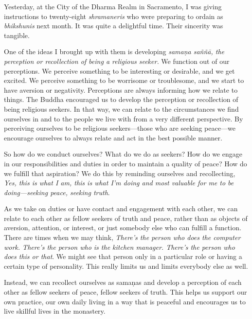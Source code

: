 
Yesterday, at the City of the Dharma Realm in Sacramento, I was giving 
instructions to twenty-eight \emph{shramaneris} who were preparing to 
ordain as \emph{bhikshunis} next month. It was quite a delightful time. 
Their sincerity was tangible.

One of the ideas I brought up with them is developing \emph{samaṇa 
saññā, the perception or recollection of being a religious seeker.} 
We function out of our perceptions. We perceive something to be 
interesting or desirable, and we get excited. We perceive something to 
be worrisome or troublesome, and we start to have aversion or 
negativity. Perceptions are always informing how we relate to things. 
The Buddha encouraged us to develop the perception or recollection of 
being religious seekers. In that way, we can relate to the 
circumstances we find ourselves in and to the people we live with from 
a very different perspective. By perceiving ourselves to be religious 
seekers---those who are seeking peace---we encourage ourselves to 
always relate and act in the best possible manner.

So how do we conduct ourselves? What do we do as seekers? How do we 
engage in our responsibilities and duties in order to maintain a 
quality of peace? How do we fulfill that aspiration? We do this by 
reminding ourselves and recollecting, \emph{Yes, this is what I am, 
this is what I'm doing and most valuable for me to be doing---seeking 
peace, seeking truth}.

As we take on duties or have contact and engagement with each other, we 
can relate to each other as fellow seekers of truth and peace, rather 
than as objects of aversion, attention, or interest, or just somebody 
else who can fulfill a function. There are times when we may think, 
\emph{There's the person who does the computer work. There's the person 
who is the kitchen manager. There's the person who does this or that}. 
We might see that person only in a particular role or having a certain 
type of personality. This really limits us and limits everybody else as 
well.

Instead, we can recollect ourselves as samaṇas and develop a 
perception of each other as fellow seekers of peace, fellow seekers of 
truth. This helps us support our own practice, our own daily living in 
a way that is peaceful and encourages us to live skillful lives in the 
monastery.


